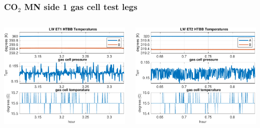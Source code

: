 \documentclass[9pt]{beamer}
\begin{document}
\begin{frame}
\frametitle{CO$_2$ MN side 1 gas cell test legs}

\begin{columns}[t]
\begin{column}{0.45\textwidth}
  \begin{centering}
  \includegraphics[width=\textwidth]{harvest_02-11/02-11_LW_ET1.pdf}
  \end{centering}
\end{column}
\begin{column}{0.45\textwidth}  
  \begin{centering}
  \includegraphics[width=\textwidth]{harvest_02-11/02-11_LW_ET2.pdf}
  \end{centering}
\end{column}
\end{columns}
\vspace{3mm}


\end{frame}
\end{document}

